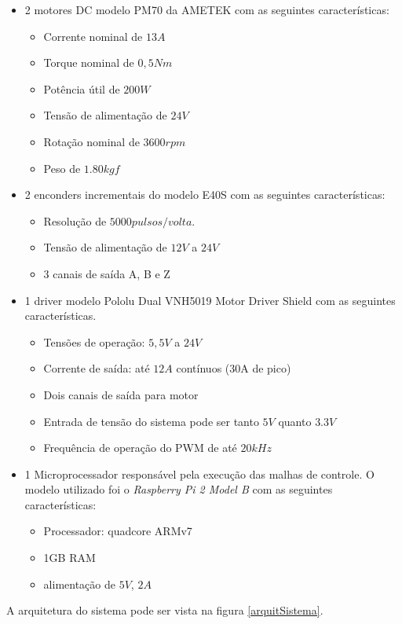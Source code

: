 \documentclass[]{politex}
\begin{document}
\begin{itemize}
\item 2 motores DC modelo PM70 da AMETEK com as seguintes características:
\begin{itemize}
\item Corrente nominal de $13A$ 
\item Torque nominal de $0,5Nm$
\item Potência útil de $200W$
\item Tensão de alimentação de $24V$
\item Rotação nominal de $3600 rpm$
\item Peso de $1.80 kgf$ 
\end{itemize}
\item  2 enconders incrementais do modelo E40S com as seguintes características:
\begin{itemize}
\item Resolução de $5000 pulsos/volta$.
\item Tensão de alimentação de $12V$ a $24V$
\item 3 canais de saída A, B e Z
\end{itemize}
\item 1 driver modelo Pololu Dual VNH5019 Motor Driver Shield com as seguintes características.
\begin{itemize}
\item Tensões de operação: $5,5V$ a $24V$
\item Corrente de saída: até $12A$ contínuos (30A de pico)
\item Dois canais de saída para motor
\item Entrada de tensão do sistema pode ser tanto $5V$ quanto $3.3V$
\item Frequência de operação do PWM de até $20kHz$
\end{itemize}
\item 1 Microprocessador responsável pela execução das malhas de controle. O modelo utilizado foi o \textit{Raspberry Pi 2 Model B} com as seguintes características:
\begin{itemize}
\item Processador: quadcore ARMv7
\item 1GB RAM
\item alimentação de $5V$, $2A$
\end{itemize}
\end{itemize}

A arquitetura do sistema pode ser vista na figura \ref{arquitSistema}.
\end{document}
